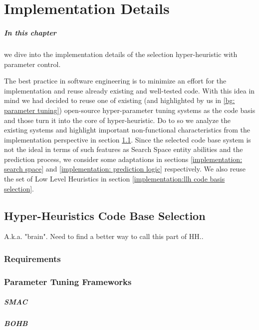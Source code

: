 \chapter{Implementation Details}
\paragraph{In this chapter} we dive into the implementation details of the selection hyper-heuristic with parameter control.
 
The best practice in software engineering is to minimize an effort for the implementation and reuse already existing and well-tested code.
With this idea in mind we had decided to reuse one of existing (and highlighted by us in \ref{bg: parameter tuning}) open-source hyper-parameter tuning systems as the code basis and those turn it into the core of hyper-heuristic. 
Do to so we analyze the existing systems and highlight important non-functional characteristics from the implementation perspective in section \ref{implementation:hh code basis section}. Since the selected code base system is not the ideal in terms of such features as Search Space entity abilities and the prediction process, we consider some adaptations in sections \ref{implementation: search space} and \ref{implementation: prediction logic} respectively.
We also reuse the set of Low Level Heuristics in section \ref{implementation:llh code basis selection}.


\section{Hyper-Heuristics Code Base Selection}\label{implementation:hh code basis section}
A.k.a. "brain". Need to find a better way to call this part of HH..
\subsection{Requirements}
\subsection{Parameter Tuning Frameworks}
\paragraph{SMAC}
\paragraph{BOHB}



